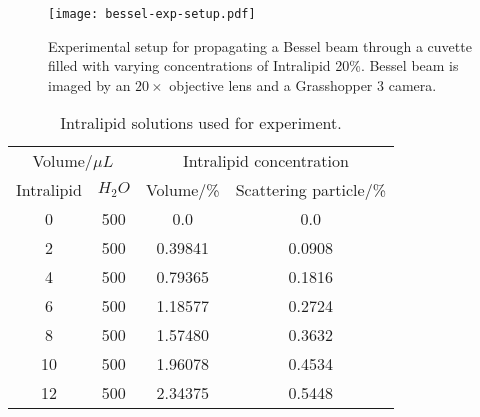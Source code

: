 \begin{figure}[ht!]
    \centering
    \texttt{[image: bessel-exp-setup.pdf]}
    \caption{Experimental setup for propagating a Bessel beam through a cuvette filled with varying concentrations of Intralipid 20\%. Bessel beam is imaged by an $20\times$ objective lens and a Grasshopper 3 camera.}
    \label{fig:expsetup}
\end{figure}

\begin{table}[!ht]
\centering
    \begin{tabular}{cc|cc}
        \hline
        \multicolumn{2}{c|}{Volume/$\mu L$} & \multicolumn{2}{|c}{Intralipid concentration}                       \\
        Intralipid                & $H_2O$  & Volume/\%      & Scattering particle/\% \\ \hline
        \multicolumn{1}{c|}{0}    & 500     & \multicolumn{1}{c|}{0.0}       & 0.0                                    \\
        \multicolumn{1}{c|}{2}    & 500     & \multicolumn{1}{c|}{0.39841} & 0.0908                                \\
        \multicolumn{1}{c|}{4}    & 500     & \multicolumn{1}{c|}{0.79365} & 0.1816                                \\
        \multicolumn{1}{c|}{6}    & 500     & \multicolumn{1}{c|}{1.18577} & 0.2724                                \\
        \multicolumn{1}{c|}{8}    & 500     & \multicolumn{1}{c|}{1.57480} & 0.3632                                \\
        \multicolumn{1}{c|}{10}   & 500     & \multicolumn{1}{c|}{1.96078} & 0.4534                                \\
        \multicolumn{1}{c|}{12}   & 500     & \multicolumn{1}{c|}{2.34375} & 0.5448                                \\ \hline
    \end{tabular}
    \caption{Intralipid solutions used for experiment.}
    \label{tab:intra}
\end{table}


